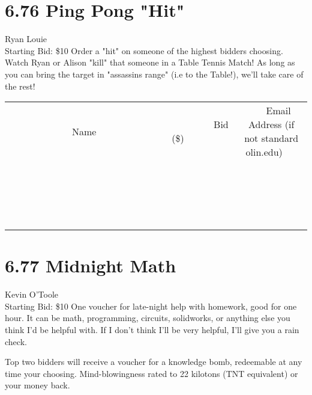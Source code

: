 \documentclass[11pt]{article}
\begin{document}
\section*{6.76 Ping Pong "Hit"}
Ryan Louie
\\
Starting Bid: \$10
\newline
Order a "hit" on someone of the highest bidders choosing.  Watch Ryan or Alison "kill" that someone in a Table Tennis Match!  As long as you can bring the target in "assassins range" (i.e to the Table!), we'll take care of the rest!
\\[3ex]
\begin{tabular}{c c c}
~~~~~~~~~~~~~Name~~~~~~~~~~~~~ & ~~~~~~~~~Bid (\$)~~~~~~~~~  & ~~~Email Address (if not standard olin.edu)~~~\\
 & & \\
\hline
 & & \\
\hline
 & & \\
\hline
 & & \\
\hline
 & & \\
\hline
 & & \\
\hline
 & & \\
\hline
 & & \\
\hline
 & & \\
\hline
 & & \\
\hline
 & & \\
\hline
 & & \\
\hline
 & & \\
\hline
 & & \\
\hline
 & & \\
\hline
 & & \\
\hline
 & & \\
\hline
 & & \\
\hline
 & & \\
\hline
\end{tabular}
\newpage
\section*{6.77 Midnight Math}
Kevin O'Toole
\\
Starting Bid: \$10
\newline
One voucher for late-night help with homework, good for one hour. It can be math, programming, circuits, solidworks, or anything else you think I'd be helpful with. If I don't think I'll be very helpful, I'll give you a rain check.

Top two bidders will receive a voucher for a knowledge bomb, redeemable at any time your choosing. Mind-blowingness rated to 22 kilotons (TNT equivalent) or your money back.
\end{document}
